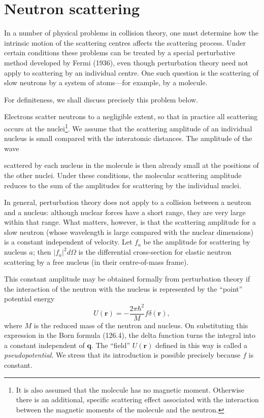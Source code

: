 \section{Neutron scattering}

In a number of physical problems in collision theory, one must determine how the intrinsic motion of the scattering centres affects the scattering process. Under certain conditions these problems can be treated by a special perturbative method developed by Fermi (1936), even though perturbation theory need not apply to scattering by an individual centre. One such question is the scattering of slow neutrons by a system of atoms---for example, by a molecule.

For definiteness, we shall discuss precisely this problem below.

Electrons scatter neutrons to a negligible extent, so that in practice all scattering occurs at the nuclei\footnote{It is also assumed that the molecule has no magnetic moment. Otherwise there is an additional, specific scattering effect associated with the interaction between the magnetic moments of the molecule and the neutron.}. We assume that the scattering amplitude of an individual nucleus is small compared with the interatomic distances. The amplitude of the wave

scattered by each nucleus in the molecule is then already small at the positions of the other nuclei. Under these conditions, the molecular scattering amplitude reduces to the sum of the amplitudes for scattering by the individual nuclei.

In general, perturbation theory does not apply to a collision between a neutron and a nucleus: although nuclear forces have a short range, they are very large within that range. What matters, however, is that the scattering amplitude for a slow neutron (whose wavelength is large compared with the nuclear dimensions) is a constant independent of velocity. Let $f_a$ be the amplitude for scattering by nucleus $a$; then $|f_a|^2d\Omega$ is the differential cross-section for elastic neutron scattering by a free nucleus (in their centre-of-mass frame).

This constant amplitude may be obtained formally from perturbation theory if the interaction of the neutron with the nucleus is represented by the ``point'' potential energy
\begin{equation}
 U(\mathbf r)=-\frac{2\pi\hbar^2}{M}f\delta(\mathbf r),
 \tag{151.1}
\end{equation}
where $M$ is the reduced mass of the neutron and nucleus. On substituting this expression in the Born formula (126.4), the delta function turns the integral into a constant independent of $\mathbf q$. The ``field'' $U(\mathbf r)$ defined in this way is called a \emph{pseudopotential}. We stress that its introduction is possible precisely because $f$ is constant.

